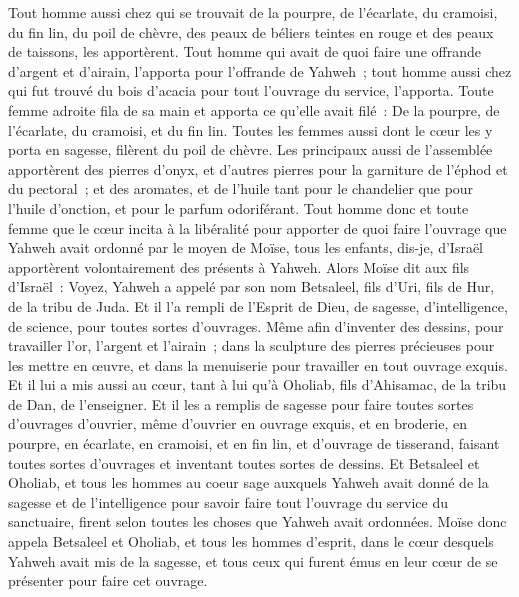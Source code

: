 \begin{multicols}{2}
Tout homme aussi chez qui se trouvait de la pourpre, de l'écarlate, du cramoisi, du fin lin, du poil de chèvre, des peaux de béliers teintes en rouge et des peaux de taissons, les apportèrent.
Tout homme qui avait de quoi faire une offrande d'argent et d'airain, l'apporta pour l'offrande de Yahweh~; tout homme aussi chez qui fut trouvé du bois d'acacia pour tout l'ouvrage du service, l'apporta.
Toute femme adroite fila de sa main et apporta ce qu'elle avait filé~: De la pourpre, de l'écarlate, du cramoisi, et du fin lin.
Toutes les femmes aussi dont le cœur les y porta en sagesse, filèrent du poil de chèvre.
Les principaux aussi de l'assemblée apportèrent des pierres d'onyx, et d'autres pierres pour la garniture de l'éphod et du pectoral~;
et des aromates, et de l'huile tant pour le chandelier que pour l'huile d'onction, et pour le parfum odoriférant.
Tout homme donc et toute femme que le cœur incita à la libéralité pour apporter de quoi faire l'ouvrage que Yahweh avait ordonné par le moyen de Moïse, tous les enfants, dis-je, d'Israël apportèrent volontairement des présents à Yahweh.
Alors Moïse dit aux fils d'Israël~: Voyez, Yahweh a appelé par son nom Betsaleel, fils d'Uri, fils de Hur, de la tribu de Juda.
Et il l'a rempli de l'Esprit de Dieu, de sagesse, d'intelligence, de science, pour toutes sortes d'ouvrages.
Même afin d'inventer des dessins, pour travailler l'or, l'argent et l'airain~;
dans la sculpture des pierres précieuses pour les mettre en œuvre, et dans la menuiserie pour travailler en tout ouvrage exquis.
Et il lui a mis aussi au cœur, tant à lui qu'à Oholiab, fils d'Ahisamac, de la tribu de Dan, de l'enseigner.
Et il les a remplis de sagesse pour faire toutes sortes d'ouvrages d'ouvrier, même d'ouvrier en ouvrage exquis, et en broderie, en pourpre, en écarlate, en cramoisi, et en fin lin, et d'ouvrage de tisserand, faisant toutes sortes d'ouvrages et inventant toutes sortes de dessins.
\VerseOne{}Et Betsaleel et Oholiab, et tous les hommes au coeur sage auxquels Yahweh avait donné de la sagesse et de l'intelligence pour savoir faire tout l'ouvrage du service du sanctuaire, firent selon toutes les choses que Yahweh avait ordonnées.
Moïse donc appela Betsaleel et Oholiab, et tous les hommes d'esprit, dans le cœur desquels Yahweh avait mis de la sagesse, et tous ceux qui furent émus en leur cœur de se présenter pour faire cet ouvrage.

\end{multicols}
